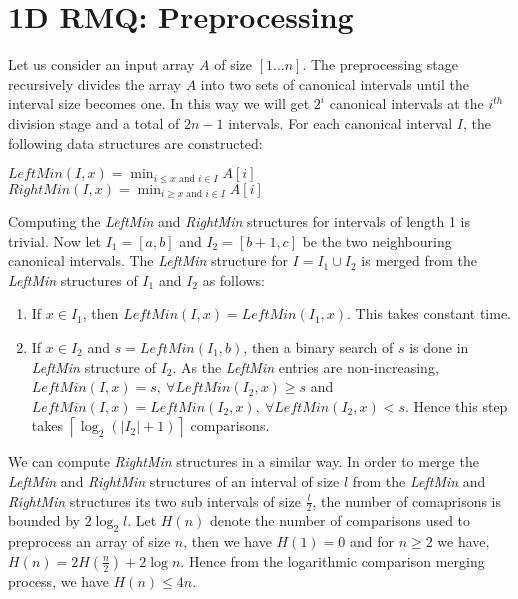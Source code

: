 \section{1D RMQ: Preprocessing}
Let us consider an input array $A$ of size $[1 \ldots n]$. The preprocessing stage 
recursively divides the array $A$ into two sets of canonical intervals until the interval size becomes one. In this way we will get $2^i$ canonical intervals at the $i^{th}$ division stage and a total of $2n-1$ intervals.
For each canonical interval $I$, the following data structures are constructed:
\begin{center}
$LeftMin(I,x)=\min_{i \leq x \text{ and } i \in I}A[i]$ \\
$RightMin(I,x)=\min_{i \geq x \text{ and } i \in I}A[i]$
\end{center}
Computing the \emph{LeftMin} and \emph{RightMin} structures for intervals of length 1 is trivial. Now let $I_1=[a,b]$ and $I_2=[b+1,c]$ be the two neighbouring canonical intervals. The \emph{LeftMin} structure for $I=I_1 \cup I_2$ is merged from the \emph{LeftMin} structures of $I_1$ and $I_2$  as follows:
\begin{enumerate}
\item If $x \in I_1$, then $LeftMin(I, x)=LeftMin(I_1, x)$. This takes constant time.
\item If $x \in I_2$ and $s=LeftMin(I_1, b)$, then a binary search of $s$ is done in \emph{LeftMin} structure of $I_2$. As the \emph{LeftMin} entries are non-increasing, $LeftMin(I, x) = s,\ \forall LeftMin(I_2, x) \geq s$ and $LeftMin(I, x) = LeftMin(I_2, x),\ \forall LeftMin(I_2, x) < s$. Hence this step takes $\left \lceil{\log_{2}(|I_2|+1)}\right \rceil$ comparisons.
\end{enumerate}
We can compute \emph{RightMin} structures in a similar way. In order to merge the \emph{LeftMin} and  \emph{RightMin} structures of an interval of size $l$ from the \emph{LeftMin} and  \emph{RightMin} structures its two sub intervals of size $\frac{l}{2}$, the number of comaprisons is bounded by $2 \log_{2}l$. Let $H(n)$ denote the number of comparisons used to preprocess an array of size $n$, then we have $H(1)=0$ and for $n \geq 2$ we have, $H(n)=2H(\frac{n}{2})+ 2 \log n$. Hence from the logarithmic comparison merging process, we have $H(n) \leq 4n$.

